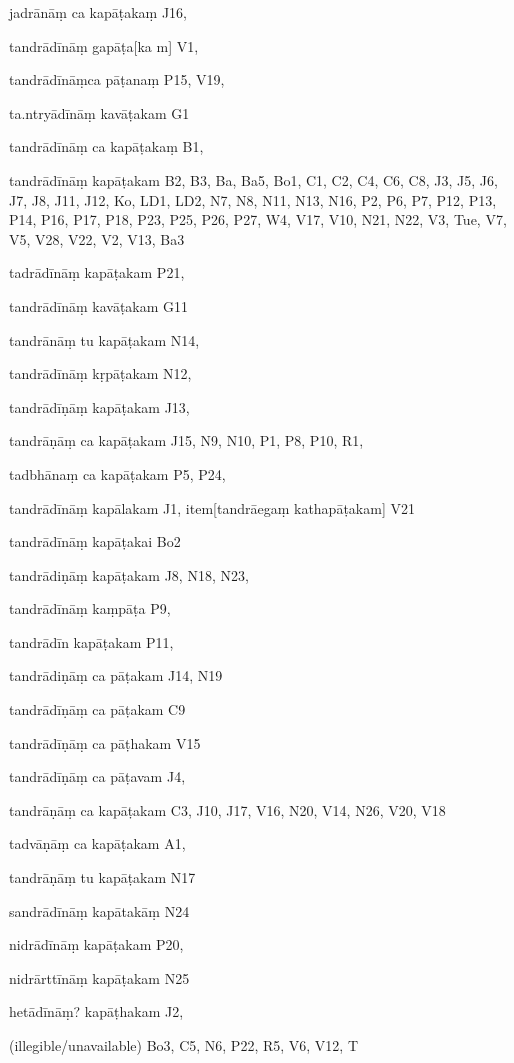 \begin{marma}[hp02_009]
\begin{marma}[hp02_011]
 \begin{marma}[hp02_33b]
\item[jadrānāṃ ca kapāṭakaṃ] J16,
\item[tandrādīnāṃ gapāṭa[ka]m] V1,
\item[tandrādīnāṃca pāṭanaṃ] P15, V19,
\item[ta.ntryādīnāṃ kavāṭakam] G1
\item[tandrādīnāṃ ca kapāṭakaṃ] B1,
\item[tandrādīnāṃ kapāṭakam] B2, B3, Ba, Ba5, Bo1, C1, C2, C4, C6, C8, J3, J5, J6, J7, J8, J11, J12, Ko, LD1, LD2, N7, N8, N11, N13, N16, P2, P6, P7, P12, P13, P14, P16, P17, P18, P23, P25, P26, P27, W4, V17, V10, N21, N22, V3, Tue, V7, V5, V28, V22, V2, V13, Ba3
\item[tadrādīnāṃ kapāṭakam] P21,
\item[tandrādīnāṃ kavāṭakam] G11
\item[tandrānāṃ tu kapāṭakam] N14,
\item[tandrādīnāṃ kṛpāṭakam] N12, 
\item[tandrādīṇāṃ kapāṭakam] J13, 
\item[tandrāṇāṃ ca kapāṭakam] J15, N9, N10, P1, P8, P10, R1, 
\item[tadbhānaṃ ca kapāṭakam] P5, P24, 
\item[tandrādīnāṃ kapālakam] J1,
item[tandrāegaṃ kathapāṭakam] V21
\item[tandrādīnāṃ kapāṭakai] Bo2
\item[tandrādiṇāṃ kapāṭakam] J8, N18, N23,
\item[tandrādīnāṃ kaṃpāṭa] P9, 
\item[tandrādīn kapāṭakam] P11,
\item[tandrādiṇāṃ ca pāṭakam] J14, N19
\item[tandrādīṇāṃ ca pāṭakam] C9
\item[tandrādīṇāṃ ca pāṭhakam] V15
\item[tandrādīṇāṃ ca pāṭavam] J4,
\item[tandrāṇāṃ ca kapāṭakam] C3, J10, J17, V16, N20, V14, N26, V20, V18
\item[tadvāṇāṃ ca kapāṭakam] A1,
\item[tandrāṇāṃ tu kapāṭakam] N17
\item[sandrādīnāṃ kapātakāṃ] N24
\item[nidrādīnāṃ kapāṭakam] P20,
\item[nidrārttīnāṃ kapāṭakam] N25
\item[hetādīnāṃ? kapāṭhakam] J2,
\item[(illegible/unavailable)] Bo3, C5, N6, P22, R5, V6, V12, T
  \begin{description}


\end{description}
\end{marma}
\end{marma}
\end{marma}

